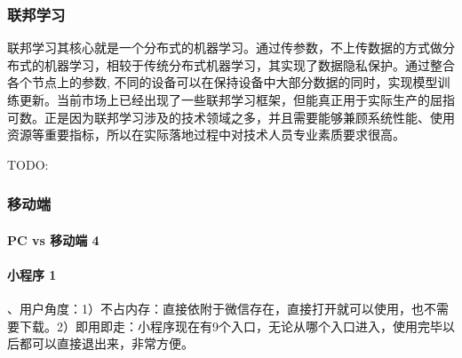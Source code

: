 \documentclass[letterpaper,11pt,english]{sphinxmanual}
\begin{document}
\subsubsection{联邦学习}
\label{\detokenize{chapter_AI_dive/Federated Learning:id1}}\label{\detokenize{chapter_AI_dive/Federated Learning::doc}}
联邦学习其核心就是一个分布式的机器学习。通过传参数，不上传数据的方式做分布式的机器学习，相较于传统分布式机器学习，其实现了数据隐私保护。通过整合各个节点上的参数,
不同的设备可以在保持设备中大部分数据的同时，实现模型训练更新。当前市场上已经出现了一些联邦学习框架，但能真正用于实际生产的屈指可数。正是因为联邦学习涉及的技术领域之多，并且需要能够兼顾系统性能、使用资源等重要指标，所以在实际落地过程中对技术人员专业素质要求很高。%
\begin{footnote}[857]\sphinxAtStartFootnote
{}
%
\end{footnote}

TODO:


\subsubsection{移动端}
\label{\detokenize{chapter_AI_dive/mobile:id1}}\label{\detokenize{chapter_AI_dive/mobile::doc}}

\paragraph{PC vs 移动端 4\sphinxfootnotemark[858]}
\label{\detokenize{chapter_AI_dive/mobile:pc-vs-4}}%
\begin{footnotetext}[858]\sphinxAtStartFootnote
{}
%
\end{footnotetext}\ignorespaces 
\begin{center}\end{center}  


\paragraph{小程序 1\sphinxfootnotemark[859]}
\label{\detokenize{chapter_AI_dive/mobile:id2}}%
\begin{footnotetext}[859]\sphinxAtStartFootnote
{}
%
\end{footnotetext}、用户角度：1）不占内存：直接依附于微信存在，直接打开就可以使用，也不需要下载。2）即用即走：小程序现在有9个入口，无论从哪个入口进入，使用完毕以后都可以直接退出来，非常方便。
\end{document}
